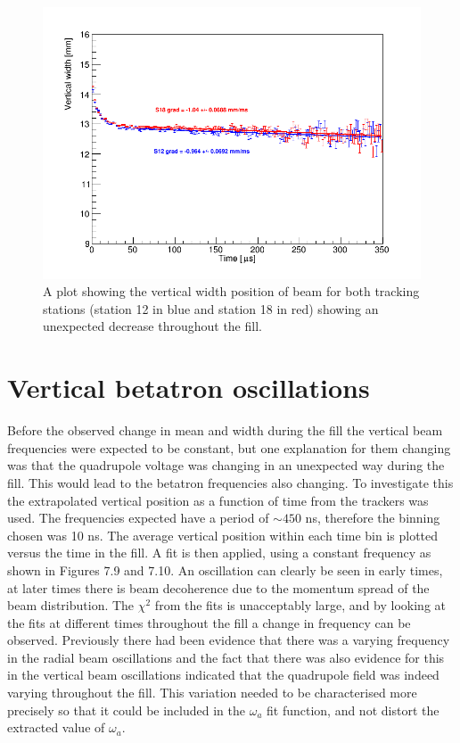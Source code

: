 \begin{figure}[!h]
\centering 
\includegraphics[scale=0.5]{Figures/AverageVerticalPosition_rebinWidthPeriod_both.png}
\decoRule
\caption{A plot showing the vertical width position of beam for both tracking stations (station 12 in blue and station 18 in red) showing an unexpected decrease throughout the fill.}
\label{fig:AverageVerticalPosition_rebinWidthPeriod_both.png}
\end{figure}

\section{Vertical betatron oscillations}

Before the observed change in mean and width during the fill the vertical beam frequencies were expected to be constant, but one explanation for them changing was that the quadrupole voltage was changing in an unexpected way during the fill. This would lead to the betatron frequencies also changing. To investigate this the extrapolated vertical position as a function of time from the trackers was used. The frequencies expected have a period of $\sim{450}$ ns, therefore the binning chosen was 10 ns. The average vertical position within each time bin is plotted versus the time in the fill. A fit is then applied, using a constant frequency as shown in Figures 7.9 and 7.10. An oscillation can clearly be seen in early times, at later times there is beam decoherence due to the momentum spread of the beam distribution. The $\chi^2$ from the fits is unacceptably large, and by looking at the fits at different times throughout the fill a change in frequency can be observed. Previously there had been evidence that there was a varying frequency in the radial beam oscillations and the fact that there was also evidence for this in the vertical beam oscillations indicated that the quadrupole field was indeed varying throughout the fill. This variation needed to be characterised more precisely so that it could be included in the $\omega_{a}$ fit function, and not distort the extracted value of $\omega_{a}$.

